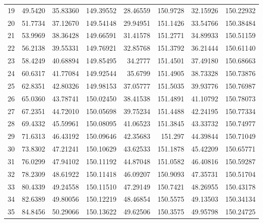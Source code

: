 \begin{table}[ht!]
{\begin{tabular}{@{}rrrrrrrr@{}}
19 & 49.5420 & 35.83360 & 149.39552 & 28.46559 & 150.9728 & 32.15926 & 150.22932 \\
20 & 51.7734 & 37.12670 & 149.54148 & 29.94951 & 151.1426 & 33.54766 & 150.38484 \\
21 & 53.9969 & 38.36428 & 149.66591 & 31.41578 & 151.2771 & 34.89933 & 150.51159 \\
22 & 56.2138 & 39.55331 & 149.76921 & 32.85768 & 151.3792 & 36.21444 & 150.61140 \\
23 & 58.4249 & 40.68894 & 149.85495 & 34.2777  & 151.4501 & 37.49180 & 150.68663 \\
24 & 60.6317 & 41.77084 & 149.92544 & 35.6799  & 151.4905 & 38.73328 & 150.73876 \\
25 & 62.8351 & 42.80326 & 149.98153 & 37.05777 & 151.5035 & 39.93776 & 150.76987 \\
26 & 65.0360 & 43.78741 & 150.02450 & 38.41538 & 151.4891 & 41.10792 & 150.78073 \\
27 & 67.2351 & 44.72010 & 150.05698 & 39.75234 & 151.4488 & 42.24195 & 150.77334 \\
28 & 69.4332 & 45.59961 & 150.08095 & 41.06523 & 151.3845 & 43.33732 & 150.74977 \\
29 & 71.6313 & 46.43192 & 150.09646 & 42.35683 & 151.297  & 44.39844 & 150.71049 \\
30 & 73.8302 & 47.21241 & 150.10629 & 43.62533 & 151.1878 & 45.42209 & 150.65771 \\
31 & 76.0299 & 47.94102 & 150.11192 & 44.87048 & 151.0582 & 46.40816 & 150.59287 \\
32 & 78.2309 & 48.61922 & 150.11418 & 46.09207 & 150.9093 & 47.35731 & 150.51704 \\
33 & 80.4339 & 49.24558 & 150.11510 & 47.29149 & 150.7421 & 48.26955 & 150.43178 \\
34 & 82.6389 & 49.80056 & 150.12219 & 48.46854 & 150.5575 & 49.13503 & 150.34134 \\
35 & 84.8456 & 50.29066 & 150.13622 & 49.62506 & 150.3575 & 49.95798 & 150.24725 \\ \bottomrule
\end{tabular}%
}
\end{table}
\vfill
\clearpage

